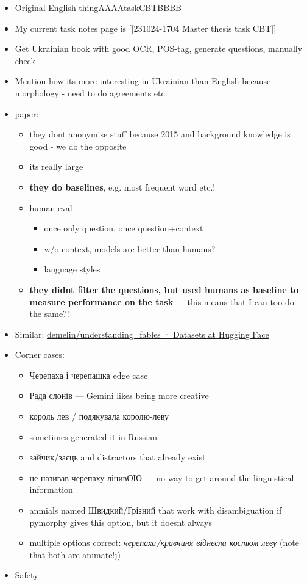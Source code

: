 \begin{itemize}
\item
  Original English thingAAAAtaskCBTBBBB
\item
  My current task notes page is {[}{[}231024-1704 Master thesis task
  CBT{]}{]}
\item
  Get Ukrainian book with good OCR, POS-tag, generate questions,
  manually check
\item
  Mention how it\textquotesingle s more interesting in Ukrainian than
  English because morphology - need to do agreements etc.
\item
  paper:

  \begin{itemize}
  \tightlist
  \item
    they don\textquotesingle t anonymise stuff because 2015 and
    background knowledge is good - we do the opposite
  \item
    it\textquotesingle s really large
  \item
    \textbf{they do baselines}, e.g. most frequent word etc.!
  \item
    human eval

    \begin{itemize}
    \tightlist
    \item
      once only question, once question+context
    \item
      w/o context, models are better than humans?
    \item
      language styles
    \end{itemize}
  \item
    \textbf{they didn\textquotesingle t filter the questions, but used
    humans as baseline to measure performance on the task} --- this
    means that I can too do the same?!
  \end{itemize}
\item
  Similar:
  \href{https://huggingface.co/datasets/demelin/understanding_fables}{demelin/understanding\_fables
  · Datasets at Hugging Face}
\item
  Corner cases:

  \begin{itemize}
  \tightlist
  \item
    Черепаха і черепашка edge case
  \item
    Рада слонів --- Gemini likes being more creative
  \item
    король лев / подякувала королю-леву
  \item
    sometimes generated it in Russian
  \item
    зайчик/заєць and distractors that already exist
  \item
    не називав черепаху лінивОЮ --- no way to get around the
    linguistical information
  \item
    anmials named Швидкий/Грізний that work with disambiguation if
    pymorphy gives this option, but it doesn\textquotesingle t always
  \item
    multiple options correct: \emph{черепаха/кравчиня віднесла костюм
    леву} (note that both are animate!j)
  \end{itemize}
\item
  Safety
\end{itemize}

